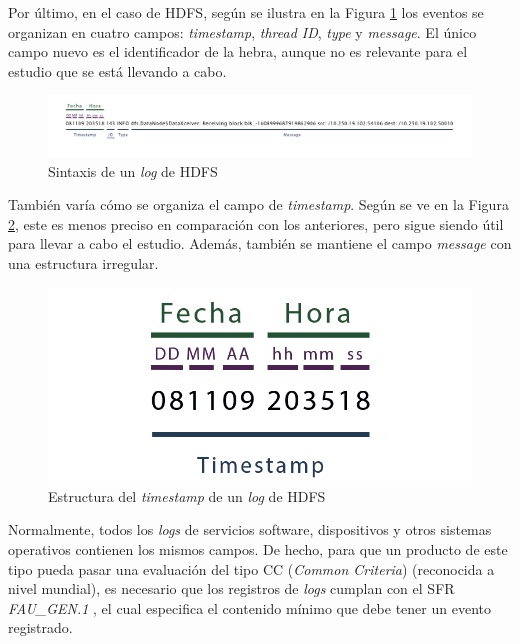 Por último, en el caso de \gls{HDFS}, según se ilustra en la Figura \ref{fig:hdfs-log-structure} los eventos se organizan en cuatro campos: \textit{timestamp}, \textit{thread ID}, \textit{type} y \textit{message}. El único campo nuevo es el identificador de la hebra, aunque no es relevante para el estudio que se está llevando a cabo.

\vspace{-1mm}

\begin{figure}[H]
    \centering
    \includegraphics[width=1\linewidth]{imagenes/hdfs-log-structure.png}
    \caption{Sintaxis de un \textit{log} de \gls{HDFS}}
    \label{fig:hdfs-log-structure}
\end{figure}

También varía cómo se organiza el campo de \textit{timestamp}. Según se ve en la Figura \ref{fig:hdfs-log-structure-timestamp}, este es menos preciso en comparación con los anteriores, pero sigue siendo útil para llevar a cabo el estudio. Además, también se mantiene el campo \textit{message} con una estructura irregular.

\vspace{-1mm}

\begin{figure}[H]
    \centering
    \includegraphics[width=0.6\linewidth]{imagenes/hdfs-log-structure-timestamp.png}
    \caption{Estructura del \textit{timestamp} de un \textit{log} de \gls{HDFS}}
    \label{fig:hdfs-log-structure-timestamp}
\end{figure}

Normalmente, todos los \textit{logs} de servicios software, dispositivos y otros sistemas operativos contienen los mismos campos. De hecho, para que un producto de este tipo pueda pasar una evaluación del tipo \gls{CC} (\textit{Common Criteria}) (reconocida a nivel mundial), es necesario que los registros de \textit{logs} cumplan con el \gls{SFR} \textit{FAU\_GEN.1}  \cite{commoncriteria}, el cual especifica el contenido mínimo que debe tener un evento registrado. \\

